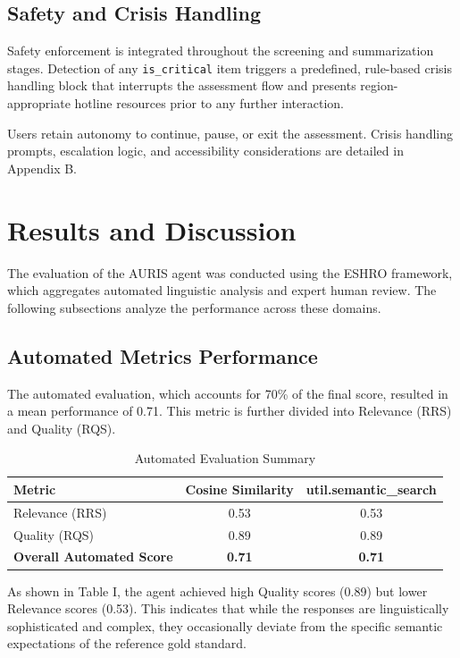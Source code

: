 ﻿\documentclass[acmsmall,screen]{acmart}
\begin{document}
\subsection{Safety and Crisis Handling}
Safety enforcement is integrated throughout the screening and summarization stages. Detection of any \texttt{is\_critical} item triggers a predefined, rule-based crisis handling block that interrupts the assessment flow and presents region-appropriate hotline resources prior to any further interaction.

Users retain autonomy to continue, pause, or exit the assessment. Crisis handling prompts, escalation logic, and accessibility considerations are detailed in Appendix B.


\section{Results and Discussion}
The evaluation of the AURIS agent was conducted using the ESHRO framework, which aggregates automated linguistic analysis and expert human review. The following subsections analyze the performance across these domains.

\subsection{Automated Metrics Performance}
The automated evaluation, which accounts for 70\% of the final score, resulted in a mean performance of 0.71. This metric is further divided into Relevance (RRS) and Quality (RQS).

\begin{table}[htbp]
\caption{Automated Evaluation Summary}
\begin{center}
\begin{tabular}{lcc}
\toprule
\textbf{Metric} & \textbf{Cosine Similarity} & \textbf{util.semantic\_search} \\
\midrule
Relevance (RRS) & 0.53 & 0.53 \\
Quality (RQS) & 0.89 & 0.89 \\
\midrule
\textbf{Overall Automated Score} & \textbf{0.71} & \textbf{0.71} \\
\bottomrule
\end{tabular}
\label{table1}
\end{center}
\end{table}

As shown in Table I, the agent achieved high Quality scores (0.89) but lower Relevance scores (0.53). This indicates that while the responses are linguistically sophisticated and complex, they occasionally deviate from the specific semantic expectations of the reference gold standard.
\end{document}
